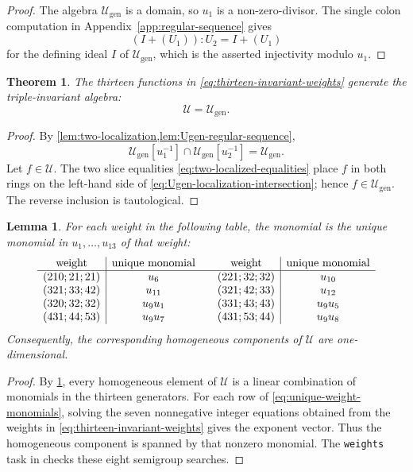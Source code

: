\documentclass[11pt,reqno]{amsart}
\numberwithin{equation}{section}
\newtheorem{theorem}{Theorem}[section]
\newtheorem{lemma}[lemma]{Lemma}
\theoremstyle{remark}
\newcommand{\UR}{\mathscr U}
\newcommand{\Ugen}{\mathscr U_{\mathrm{gen}}}
\begin{document}
\begin{proof}
The algebra $\Ugen$ is a domain, so $u_1$ is a non-zero-divisor.  The
single colon computation in Appendix~\ref{app:regular-sequence} gives
\[ (I+(U_1)):U_2=I+(U_1) \]
for the defining ideal $I$ of $\Ugen$, which is the asserted
injectivity modulo $u_1$.
\end{proof}

\begin{theorem}
\label{thm:thirteen-generate}
The thirteen functions in \eqref{eq:thirteen-invariant-weights} generate the
triple-invariant algebra:
\[ \UR=\Ugen. \]
\end{theorem}

\begin{proof}
By \cref{lem:two-localization,lem:Ugen-regular-sequence},
\begin{equation}
\label{eq:Ugen-localization-intersection}
 \Ugen[u_1^{-1}]\cap\Ugen[u_2^{-1}]=\Ugen.
\end{equation}
Let $f\in\UR$.  The two slice equalities
\eqref{eq:two-localized-equalities} place $f$ in both rings on the
left-hand side of \eqref{eq:Ugen-localization-intersection}; hence
$f\in\Ugen$.  The reverse inclusion is tautological.
\end{proof}

\begin{lemma}
\label{lem:relevant-one-dimensional-weights}
For each weight in the following table, the monomial is the unique
monomial in $u_1,\ldots,u_{13}$ of that weight:
\begin{equation}
\label{eq:unique-weight-monomials}
\begin{array}{c|c@{\qquad}c|c}
\text{weight}&\text{unique monomial}&\text{weight}&\text{unique monomial}\\ \hline
(210;21;21)&u_6&(221;32;32)&u_{10}\\
(321;33;42)&u_{11}&(321;42;33)&u_{12}\\
(320;32;32)&u_9u_1&(331;43;43)&u_9u_5\\
(431;44;53)&u_9u_7&(431;53;44)&u_9u_8
\end{array}
\end{equation}
Consequently, the corresponding homogeneous components of $\UR$ are
one-dimensional.
\end{lemma}

\begin{proof}
By \cref{thm:thirteen-generate}, every homogeneous element of $\UR$ is a
linear combination of monomials in the thirteen generators.  For each row
of \eqref{eq:unique-weight-monomials}, solving the seven nonnegative integer
equations obtained from the weights in
\eqref{eq:thirteen-invariant-weights} gives the exponent
vector.  Thus the homogeneous component is spanned by that nonzero
monomial.  The \texttt{weights} task in  checks
these eight semigroup searches.
\end{proof}
\end{document}
